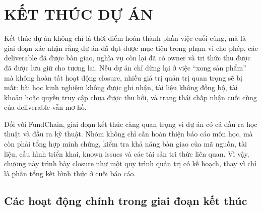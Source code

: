 \chapter{KẾT THÚC DỰ ÁN}

Kết thúc dự án không chỉ là thời điểm hoàn thành phần việc cuối cùng, mà là giai đoạn xác nhận rằng dự án đã đạt được mục tiêu trong phạm vi cho phép, các deliverable đã được bàn giao, nghĩa vụ còn lại đã có owner và tri thức thu được đã được lưu giữ cho tương lai. Nếu dự án chỉ dừng lại ở việc ``xong sản phẩm'' mà không hoàn tất hoạt động closure, nhiều giá trị quản trị quan trọng sẽ bị mất: bài học kinh nghiệm không được ghi nhận, tài liệu không đồng bộ, tài khoản hoặc quyền truy cập chưa được thu hồi, và trạng thái chấp nhận cuối cùng của deliverable vẫn mơ hồ.

Đối với FundChain, giai đoạn kết thúc càng quan trọng vì dự án có cả đầu ra học thuật và đầu ra kỹ thuật. Nhóm không chỉ cần hoàn thiện báo cáo môn học, mà còn phải tổng hợp minh chứng, kiểm tra khả năng bàn giao của mã nguồn, tài liệu, cấu hình triển khai, known issues và các tài sản tri thức liên quan. Vì vậy, chương này trình bày closure như một quy trình quản trị có kế hoạch, thay vì chỉ là phần tổng kết hình thức ở cuối báo cáo.

\section{Các hoạt động chính trong giai đoạn kết thúc}

